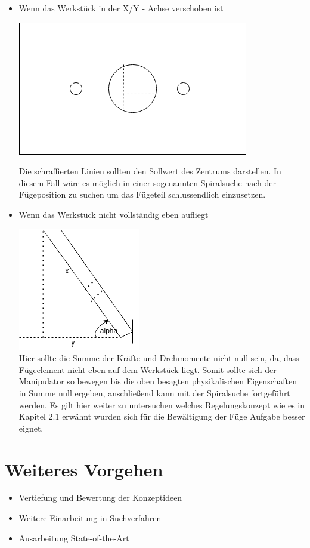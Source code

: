 \documentclass[12pt]{article}
\begin{document}
\begin{itemize}
\item
Wenn das Werkstück in der X/Y - Achse verschoben ist
\begin{center}
\includegraphics[scale=0.5]{img/verschobenes_werkstueck}\\
\end{center}

Die schraffierten Linien sollten den Sollwert des Zentrums darstellen. In diesem Fall wäre es möglich
in einer sogenannten Spiralsuche nach der Fügeposition zu suchen um das Fügeteil schlussendlich einzusetzen.
\newpage
\item 
Wenn das Werkstück nicht vollständig eben aufliegt

\includegraphics[scale=0.8]{img/winkel_werkstueck}\\

Hier sollte die Summe der Kräfte und Drehmomente nicht null sein, da, dass Fügeelement nicht eben auf dem Werkstück liegt. Somit sollte sich der Manipulator so bewegen bis die oben besagten physikalischen Eigenschaften in Summe null ergeben, anschließend kann mit der Spiralsuche fortgeführt werden. Es gilt hier weiter zu untersuchen welches Regelungskonzept wie es in Kapitel 2.1 erwähnt wurden sich für die Bewältigung der Füge Aufgabe besser eignet.
\end{itemize}

\section{Weiteres Vorgehen}
\begin{itemize}
\item Vertiefung und Bewertung der Konzeptideen
\item Weitere Einarbeitung in Suchverfahren
\item Ausarbeitung State-of-the-Art
\end{itemize}
\end{document}
